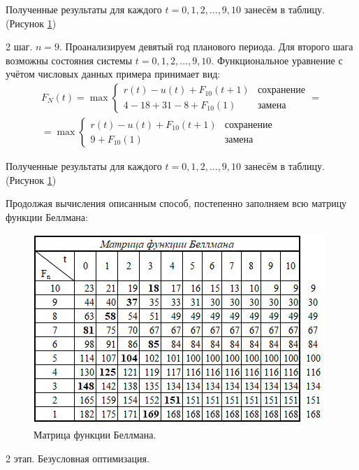 Полученные результаты для каждого $t = 0,1,2, \hdots, 9,10$ занесём в таблицу. (Рисунок \ref{fig:bellman_equipment})

2 шаг. $n=9$. Проанализируем девятый год планового периода. Для второго шага возможны состояния системы $t=0,1,2, \hdots ,9,10$. Функциональное уравнение с учётом числовых данных примера принимает вид: 
\begin{equation}
\begin{multlined}
    F_N(t) = \max\begin{cases}
                    r(t)-u(t)+F_{10}(t+1) & \textit{сохранение}\\
                    4-18+31-8+F_{10}(1) & \textit{замена}
                \end{cases} =\\
            = \max\begin{cases}
                    r(t)-u(t)+F_{10}(t+1) & \textit{сохранение}\\
                    9+F_{10}(1) & \textit{замена}
                \end{cases}
\end{multlined}
\end{equation}

Полученные результаты для каждого $t = 0,1,2, \hdots, 9,10$ занесём в таблицу. (Рисунок \ref{fig:bellman_equipment})

Продолжая вычисления описанным способ, постепенно заполняем всю матрицу функции Беллмана:

\begin{figure}[h]
  \centering \includegraphics[scale=1]{content/images/bellman_equipment.png}
  \caption{Матрица функции Беллмана.}
  \label{fig:bellman_equipment}
\end{figure}

2 этап. Безусловная оптимизация.


